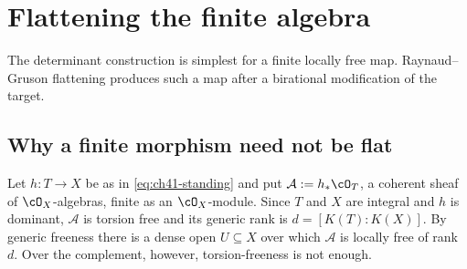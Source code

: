 \section{Flattening the finite algebra}
\label{sec:ch41-flattening}

The determinant construction is simplest for a finite locally free map.
Raynaud--Gruson flattening produces such a map after a birational
modification of the target.

\subsection{Why a finite morphism need not be flat}
\label{sec:ch41-nonflat}

Let $h:T\to X$ be as in \eqref{eq:ch41-standing} and put
$\mathcal A:=h_*\cO_T$, a coherent sheaf of $\cO_X$-algebras, finite as
an $\cO_X$-module.  Since $T$ and $X$ are integral and $h$ is
dominant, $\mathcal A$ is torsion free and its generic rank is
$d=[K(T):K(X)]$.  By generic freeness there is a dense open
$U\subseteq X$ over which $\mathcal A$ is locally free of rank $d$.
Over the complement, however, torsion-freeness is not enough.

